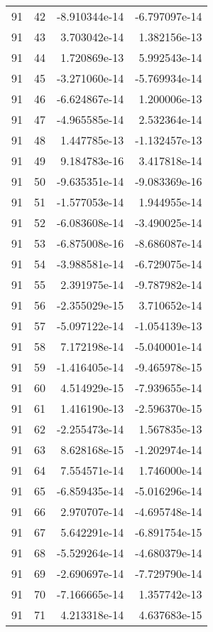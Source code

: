 \begin{tabular}{rrrr}
  91 &   42 & -8.910344e-14 & -6.797097e-14 \\
  91 &   43 &  3.703042e-14 &  1.382156e-13 \\
  91 &   44 &  1.720869e-13 &  5.992543e-14 \\
  91 &   45 & -3.271060e-14 & -5.769934e-14 \\
  91 &   46 & -6.624867e-14 &  1.200006e-13 \\
  91 &   47 & -4.965585e-14 &  2.532364e-14 \\
  91 &   48 &  1.447785e-13 & -1.132457e-13 \\
  91 &   49 &  9.184783e-16 &  3.417818e-14 \\
  91 &   50 & -9.635351e-14 & -9.083369e-16 \\
  91 &   51 & -1.577053e-14 &  1.944955e-14 \\
  91 &   52 & -6.083608e-14 & -3.490025e-14 \\
  91 &   53 & -6.875008e-16 & -8.686087e-14 \\
  91 &   54 & -3.988581e-14 & -6.729075e-14 \\
  91 &   55 &  2.391975e-14 & -9.787982e-14 \\
  91 &   56 & -2.355029e-15 &  3.710652e-14 \\
  91 &   57 & -5.097122e-14 & -1.054139e-13 \\
  91 &   58 &  7.172198e-14 & -5.040001e-14 \\
  91 &   59 & -1.416405e-14 & -9.465978e-15 \\
  91 &   60 &  4.514929e-15 & -7.939655e-14 \\
  91 &   61 &  1.416190e-13 & -2.596370e-15 \\
  91 &   62 & -2.255473e-14 &  1.567835e-13 \\
  91 &   63 &  8.628168e-15 & -1.202974e-14 \\
  91 &   64 &  7.554571e-14 &  1.746000e-14 \\
  91 &   65 & -6.859435e-14 & -5.016296e-14 \\
  91 &   66 &  2.970707e-14 & -4.695748e-14 \\
  91 &   67 &  5.642291e-14 & -6.891754e-15 \\
  91 &   68 & -5.529264e-14 & -4.680379e-14 \\
  91 &   69 & -2.690697e-14 & -7.729790e-14 \\
  91 &   70 & -7.166665e-14 &  1.357742e-13 \\
  91 &   71 &  4.213318e-14 &  4.637683e-15 \\

\end{tabular}
